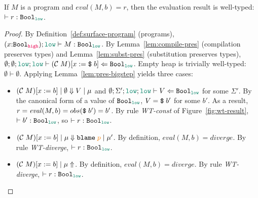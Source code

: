 \begin{theorem}
  \label{thm:type-safety}
  If $M$ is a \Surface program
  and $\mathit{eval}(M,b)=r$,
  then the evaluation result is well-typed: $\vdash r : \Bool_{\low}$.
\end{theorem}
\begin{proof}
  By Definition~\ref{def:surface-program} (\Surface programs),
  $(x{:}\Bool_{\high});\low \vdash M : \Bool_{\low}$. By
  Lemma~\ref{lem:compile-pres} (compilation preserves types) and
  Lemma~\ref{lem:subst-pres} (substitution preserves types), $\emptyset ;
  \emptyset ; \low ; \low \vdash (\compile{M})[x:=\ccconst{b}] \Leftarrow
  \Bool_{\low}$. Empty heap is trivially well-typed: $\emptyset \vdash
  \emptyset$. Applying Lemma~\ref{lem:pres-bigstep} yields three cases:
  \begin{itemize}
  \item $(\mathcal{C}\;{M})[x:=b] \mid \emptyset \Downarrow V \mid \mu$ and $\emptyset ; \Sigma' ; \low
    ; \low \vdash V \Leftarrow \Bool_{\low}$ for some $\Sigma'$. By the
    canonical form of a value of $\Bool_{\low}$, $V = \text{\texttt{{\$}}}\;{b'}$ for some
    $b'$. As a result, $r=\mathit{eval}(M,b)=obs(\text{\texttt{{\$}}}\;{b'})=b'$. By rule
    \textit{WT-const} of Figure~\ref{fig:wt-result}, $\vdash b' : \Bool_{\low}$,
    so $\vdash r : \Bool_{\low}$.
  \item $(\compile{M})[x:=b] \mid \mu \Downarrow \blame{p} \mid \mu'$. By
    definition, $\mathit{eval}(M,b)=\mathit{diverge}$. By rule
    \textit{WT-diverge}, $\vdash r : \Bool_{\low}$.
  \item $(\mathcal{C}\;{M})[x:=b] \mid \mu \Uparrow$. By
    definition, $\mathit{eval}(M,b)=\mathit{diverge}$. By rule
    \textit{WT-diverge}, $\vdash r : \Bool_{\low}$.
  \end{itemize}
\end{proof}

